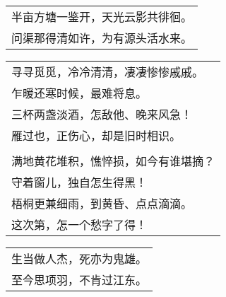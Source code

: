 \nopagebreak%
\nopagebreak%
\noindent\begin{minipage}{\linewidth}
  \vskip-3pt\begin{table}[H]
    \centering
    \begin{tabular}{@{}l@{}}
半亩方塘一鉴开，天光云影共徘徊。\\
问渠那得清如许，为有源头活水来。
    \end{tabular}
  \end{table}
\end{minipage}
\vspace{1cm}


\nopagebreak%
\nopagebreak%
\noindent\begin{minipage}{\linewidth}
  \vskip-3pt\begin{table}[H]
    \centering
    \begin{tabular}{@{}l@{}}
寻寻觅觅，冷冷清清，凄凄惨惨戚戚。\\
乍暖还寒时候，最难将息。\\
三杯两盏淡酒，怎敌他、晚来风急！\\
雁过也，正伤心，却是旧时相识。\\
\\
满地黄花堆积，憔悴损，如今有谁堪摘？\\
守着窗儿，独自怎生得黑！\\
梧桐更兼细雨，到黄昏、点点滴滴。\\
这次第，怎一个愁字了得！
    \end{tabular}
  \end{table}
\end{minipage}
\vspace{1cm}


\nopagebreak%
\nopagebreak%
\noindent\begin{minipage}{\linewidth}
  \vskip-3pt\begin{table}[H]
    \centering
    \begin{tabular}{@{}l@{}}
生当做人杰，死亦为鬼雄。\\
至今思项羽，不肯过江东。
    \end{tabular}
  \end{table}
\end{minipage}
\vspace{1cm}


